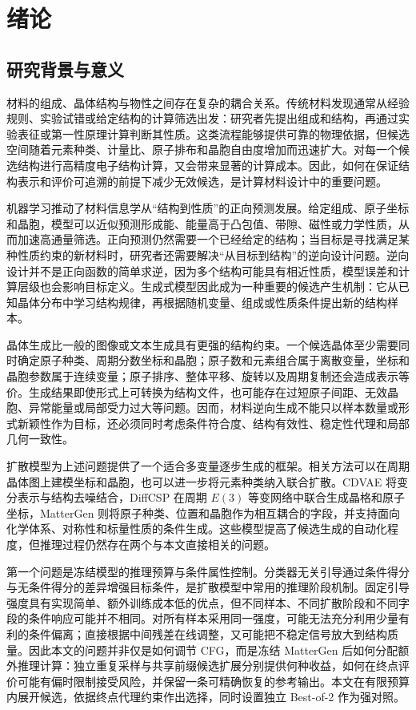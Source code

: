 \chapter{绪论}

\section{研究背景与意义}

材料的组成、晶体结构与物性之间存在复杂的耦合关系。传统材料发现通常从经验规则、实验试错或给定结构的计算筛选出发：研究者先提出组成和结构，再通过实验表征或第一性原理计算判断其性质。这类流程能够提供可靠的物理依据，但候选空间随着元素种类、计量比、原子排布和晶胞自由度增加而迅速扩大。对每一个候选结构进行高精度电子结构计算，又会带来显著的计算成本。因此，如何在保证结构表示和评价可追溯的前提下减少无效候选，是计算材料设计中的重要问题。

机器学习推动了材料信息学从``结构到性质''的正向预测发展。给定组成、原子坐标和晶胞，模型可以近似预测形成能、能量高于凸包值、带隙、磁性或力学性质，从而加速高通量筛选。正向预测仍然需要一个已经给定的结构；当目标是寻找满足某种性质约束的新材料时，研究者还需要解决``从目标到结构''的逆向设计问题。逆向设计并不是正向函数的简单求逆，因为多个结构可能具有相近性质，模型误差和计算层级也会影响目标定义。生成式模型因此成为一种重要的候选产生机制：它从已知晶体分布中学习结构规律，再根据随机变量、组成或性质条件提出新的结构样本\citep{nouira2018,xie2022,jiao2023}。

晶体生成比一般的图像或文本生成具有更强的结构约束。一个候选晶体至少需要同时确定原子种类、周期分数坐标和晶胞；原子数和元素组合属于离散变量，坐标和晶胞参数属于连续变量；原子排序、整体平移、旋转以及周期复制还会造成表示等价。生成结果即使形式上可转换为结构文件，也可能存在过短原子间距、无效晶胞、异常能量或局部受力过大等问题。因而，材料逆向生成不能只以样本数量或形式新颖性作为目标，还必须同时考虑条件符合度、结构有效性、稳定性代理和局部几何一致性。

扩散模型为上述问题提供了一个适合多变量逐步生成的框架。相关方法可以在周期晶体图上建模坐标和晶胞，也可以进一步将元素种类纳入联合扩散。CDVAE 将变分表示与结构去噪结合，DiffCSP 在周期 \(E(3)\) 等变网络中联合生成晶格和原子坐标，MatterGen 则将原子种类、位置和晶胞作为相互耦合的字段，并支持面向化学体系、对称性和标量性质的条件生成\citep{xie2022,jiao2023,jiao2024,zeni2025}。这些模型提高了候选生成的自动化程度，但推理过程仍然存在两个与本文直接相关的问题。

第一个问题是冻结模型的推理预算与条件属性控制。分类器无关引导通过条件得分与无条件得分的差异增强目标条件，是扩散模型中常用的推理阶段机制\citep{ho2020,song2021,ho2022}。固定引导强度具有实现简单、额外训练成本低的优点，但不同样本、不同扩散阶段和不同字段的条件响应可能并不相同。对所有样本采用同一强度，可能无法充分利用少量有利的条件偏离；直接根据中间残差在线调整，又可能把不稳定信号放大到结构质量。因此本文的问题并非仅是如何调节 CFG，而是冻结 MatterGen 后如何分配额外推理计算：独立重复采样与共享前缀候选扩展分别提供何种收益，如何在终点评价可能有偏时限制接受风险，并保留一条可精确恢复的参考输出。本文在有限预算内展开候选，依据终点代理约束作出选择，同时设置独立 Best-of-2 作为强对照。

